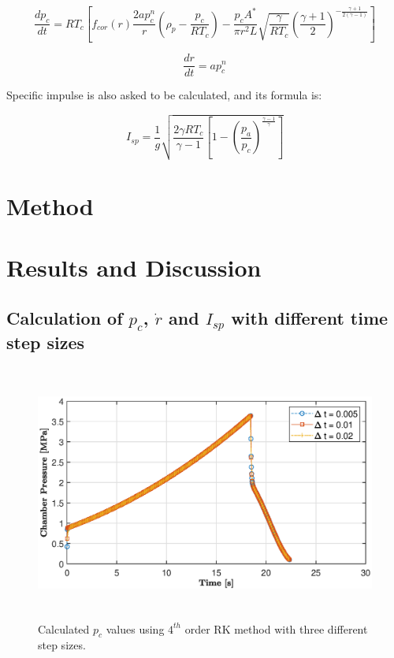 \documentclass[letterpaper,12pt]{article}
\begin{document}
\begin{equation}
	\boxed{\frac{dp_c}{dt} = RT_c[f_{cor}(r)\frac{2ap_c^{n}}{r}(\rho_{p} - \frac{p_c}{RT_c}) - \frac{p_cA^{*}}{\pi r^{2}L}\sqrt{\frac{\gamma}{RT_c}}(\frac{\gamma +1}{2})^{-\frac{\gamma +1}{2(\gamma -1)}}]}
\end{equation}

\begin{equation}
	\boxed{\frac{dr}{dt} = ap_c^{n}}
\end{equation}

Specific impulse is also asked to be calculated, and its formula is:

\begin{equation}
	\boxed{I_{sp} = \frac{1}{g}\sqrt{\frac{2\gamma RT_c}{\gamma -1}[1-(\frac{p_a}{p_c})^{\frac{\gamma -1}{\gamma}}]}}
\end{equation}

\section{Method}

\newpage

\section{Results and Discussion}
\subsection{Calculation of $p_c$, $\dot{r}$ and $I_{sp}$ with different time step sizes}

\begin{figure} [ht]
	\centering
	\includegraphics[height = 8.4cm]{graphs/q1_pc.eps}
	\caption{Calculated $p_c$ values using $4^{th}$ order RK method with three different step sizes.}
     \label{fig:q1pc}
\end{figure}
\end{document}
